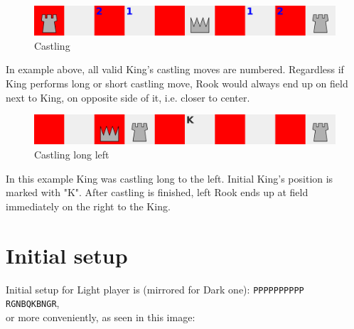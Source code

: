\documentclass[a5paper,12pt,draft]{book} %
\begin{document}
\noindent
\begin{figure}[!h]
\includegraphics[width=1.0\textwidth, keepaspectratio=true]{../gfx/castlings/04_croatian_ties_castling.png}
\caption{Castling}
\label{fig:cc_castling}
\end{figure}

In example above, all valid King's castling moves are numbered. Regardless if King performs
long or short castling move, Rook would always end up on field next to King, on opposite side
of it, i.e. closer to center.

\noindent
\begin{figure}[!h]
\includegraphics[width=1.0\textwidth, keepaspectratio=true]{../gfx/castlings/long_left/04_croatian_ties_castling_long_left.png}
\caption{Castling long left}
\label{fig:cc_castling_long_left}
\end{figure}

In this example King was castling long to the left. Initial King's position is marked with "K".
After castling is finished, left Rook ends up at field immediately on the right to the King.

\clearpage

\section*{Initial setup}

Initial setup for Light player is (mirrored for Dark one):
\texttt{PPPPPPPPPP \\
        RGNBQKBNGR}, \\
or more conveniently, as seen in this image:
\end{document}
